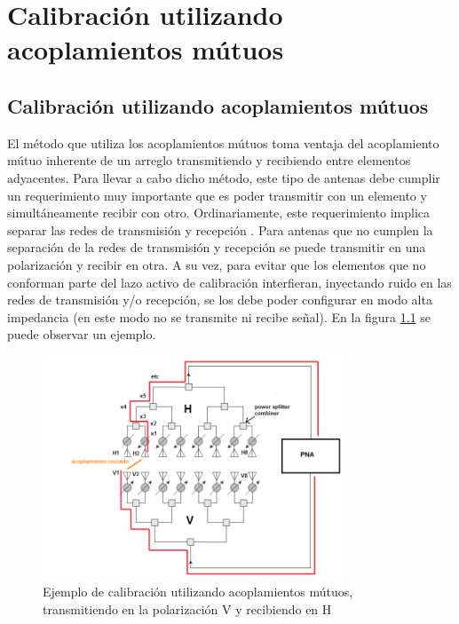 \chapter{Calibración utilizando acoplamientos mútuos}
\label{ch:convertidores}

\section{Calibración utilizando acoplamientos mútuos}

El método que utiliza los acoplamientos mútuos toma ventaja del acoplamiento mútuo inherente de un arreglo transmitiendo 
y recibiendo entre elementos adyacentes. Para llevar a cabo dicho método, este tipo de antenas debe cumplir un 
requerimiento muy importante que es poder transmitir con un elemento y simultáneamente recibir con otro. 
Ordinariamente, este requerimiento implica separar las redes de transmisión y recepción \cite{Gao2001}. Para antenas que no 
cumplen la separación de la redes de transmisión y recepción se puede transmitir en una polarización y recibir en otra. A 
su vez, para evitar que los elementos que no conforman parte del lazo activo de calibración interfieran, inyectando ruido en 
las redes de transmisión y/o recepción, se los debe poder configurar en modo alta impedancia (en este modo no se transmite ni recibe señal). 
En la figura \ref{fig:mutual_general} se puede observar un ejemplo.



\begin{figure}[H]
 \centering
 \includegraphics[width=9cm]{gfx/mutualCouplingExample.png}
 \caption{Ejemplo de calibración utilizando acoplamientos mútuos, transmitiendo en la polarización V y recibiendo en H}
 \label{fig:mutual_general}
\end{figure}

